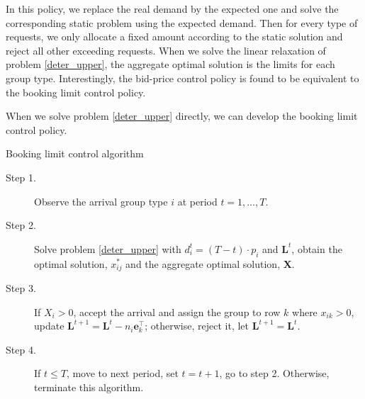 In this policy, we replace the real demand by the expected one and solve the corresponding static problem using the expected demand. Then for every type of requests, we only allocate a fixed amount according to the static solution and reject all other exceeding requests. When we solve the linear relaxation of problem \eqref{deter_upper}, the aggregate optimal solution is the limits for each group type. Interestingly, the bid-price control policy is found to be equivalent to the booking limit control policy.

When we solve problem \eqref{deter_upper} directly, we can develop the booking limit control policy.

\begin{algorithm}[H]
  \caption{Booking limit control algorithm}
  \begin{description}
    \item[Step 1.] Observe the arrival group type $i$ at period $t = 1, \ldots, T$.
    \item[Step 2.] Solve problem \eqref{deter_upper} with $d_i^{t} = (T-t) \cdot p_i$ and $\mathbf{L}^{t}$, obtain the optimal solution, $x_{ij}^{*}$ and the aggregate optimal solution, $\mathbf{X}$.
    \item[Step 3.] If $X_{i} > 0$, accept the arrival and assign the group to row $k$ where $x_{ik} > 0$, update $\mathbf{L}^{t+1} = \mathbf{L}^{t} - n_i \mathbf{e}_{k}^{\top}$; otherwise, reject it, let $\mathbf{L}^{t+1} = \mathbf{L}^{t}$.
    \item[Step 4.] If $t \leq T$, move to next period, set $t = t+1$, go to step 2. Otherwise, terminate this algorithm.
  \end{description}
\end{algorithm}



